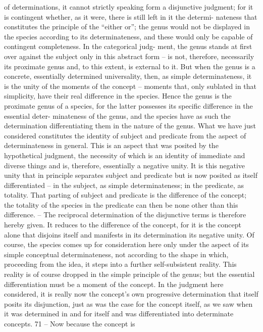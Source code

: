 of determinations, it cannot strictly speaking form a disjunctive judgment;
for it is contingent whether, as it were, there is still left in it the determi-
nateness that constitutes the principle of the “either or”; the genus would
not be displayed in the species according to its determinateness, and these
would only be capable of contingent completeness. In the categorical judg-
ment, the genus stands at first over against the subject only in this abstract
form – is not, therefore, necessarily its proximate genus and, to this extent,
is external to it. But when the genus is a concrete, essentially determined
universality, then, as simple determinateness, it is the unity of the moments
of the concept – moments that, only sublated in that simplicity, have their
real difference in the species. Hence the genus is the proximate genus of a
species, for the latter possesses its specific difference in the essential deter-
minateness of the genus, and the species have as such the determination
differentiating them in the nature of the genus.
What we have just considered constitutes the identity of subject and
predicate from the aspect of determinateness in general. This is an aspect
that was posited by the hypothetical judgment, the necessity of which is
an identity of immediate and diverse things and is, therefore, essentially a
negative unity. It is this negative unity that in principle separates subject
and predicate but is now posited as itself differentiated – in the subject,
as simple determinateness; in the predicate, as totality. That parting of
subject and predicate is the difference of the concept; the totality of the
species in the predicate can then be none other than this difference. – The
reciprocal determination of the disjunctive terms is therefore hereby given.
It reduces to the difference of the concept, for it is the concept alone
that disjoins itself and manifests in its determination its negative unity.
Of course, the species comes up for consideration here only under the
aspect of its simple conceptual determinateness, not according to the shape
in which, proceeding from the idea, it steps into a further self-subsistent
reality. This reality is of course dropped in the simple principle of the genus;
but the essential differentiation must be a moment of the concept. In the
judgment here considered, it is really now the concept's own progressive
determination that itself posits its disjunction, just as was the case for the
concept itself, as we saw when it was determined in and for itself and was
differentiated into determinate concepts. 71 – Now because the concept is
